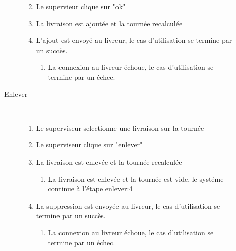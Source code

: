 \begin{description}
\begin{description}
\begin{enumerate}
\begin{enumerate}
            \end{enumerate}
            \item Le supervieur clique sur "ok"
            \item La livraison est ajout\'ee et la tourn\'ee recalcul\'ee
            \item L'ajout est envoy\'e au livreur, le cas d'utilisation se termine par un succ\`es.
            \begin{enumerate}
                \item La connexion au livreur \'echoue, le cas d'utilisation se termine par un \'echec.
            \end{enumerate}
        \end{enumerate}
        \item[Enlever] ~
        \begin{enumerate}
            \item Le superviseur selectionne une livraison sur la tourn\'ee
            \item Le superviseur clique sur "enlever"
            \item La livraison est enlev\'ee et la tourn\'ee recalcul\'ee
            \begin{enumerate}
                \item La livraison est enlev\'ee et la tourn\'ee est vide, le syst\'eme continue \`a l'\'etape enlever:4
            \end{enumerate}
            \item La suppression est envoy\'ee au livreur, le cas d'utilisation se termine par un succ\`es.
            \begin{enumerate}
                \item La connexion au livreur \'echoue, le cas d'utilisation se termine par un \'echec.
            \end{enumerate}
        \end{enumerate}
    \end{description}
\end{description}
\pagebreak


